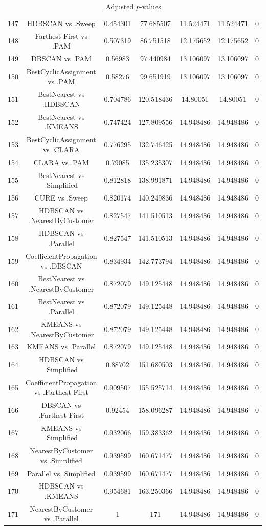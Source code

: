 \documentclass[a4paper,10pt]{article}
\begin{document}
\begin{landscape}
\begin{table}[!htp]
\begin{tabular}{ccccccc}
147&HDBSCAN vs .Sweep&0.454301&77.685507&11.524471&11.524471&0\\
148&Farthest-First vs .PAM&0.507319&86.751518&12.175652&12.175652&0\\
149&DBSCAN vs .PAM&0.56983&97.440984&13.106097&13.106097&0\\
150&BestCyclicAssignment vs .PAM&0.58276&99.651919&13.106097&13.106097&0\\
151&BestNearest vs .HDBSCAN&0.704786&120.518436&14.80051&14.80051&0\\
152&BestNearest vs .KMEANS&0.747424&127.809556&14.948486&14.948486&0\\
153&BestCyclicAssignment vs .CLARA&0.776295&132.746425&14.948486&14.948486&0\\
154&CLARA vs .PAM&0.79085&135.235307&14.948486&14.948486&0\\
155&BestNearest vs .Simplified&0.812818&138.991871&14.948486&14.948486&0\\
156&CURE vs .Sweep&0.820174&140.249836&14.948486&14.948486&0\\
157&HDBSCAN vs .NearestByCustomer&0.827547&141.510513&14.948486&14.948486&0\\
158&HDBSCAN vs .Parallel&0.827547&141.510513&14.948486&14.948486&0\\
159&CoefficientPropagation vs .DBSCAN&0.834934&142.773794&14.948486&14.948486&0\\
160&BestNearest vs .NearestByCustomer&0.872079&149.125448&14.948486&14.948486&0\\
161&BestNearest vs .Parallel&0.872079&149.125448&14.948486&14.948486&0\\
162&KMEANS vs .NearestByCustomer&0.872079&149.125448&14.948486&14.948486&0\\
163&KMEANS vs .Parallel&0.872079&149.125448&14.948486&14.948486&0\\
164&HDBSCAN vs .Simplified&0.88702&151.680503&14.948486&14.948486&0\\
165&CoefficientPropagation vs .Farthest-First&0.909507&155.525714&14.948486&14.948486&0\\
166&DBSCAN vs .Farthest-First&0.92454&158.096287&14.948486&14.948486&0\\
167&KMEANS vs .Simplified&0.932066&159.383362&14.948486&14.948486&0\\
168&NearestByCustomer vs .Simplified&0.939599&160.671477&14.948486&14.948486&0\\
169&Parallel vs .Simplified&0.939599&160.671477&14.948486&14.948486&0\\
170&HDBSCAN vs .KMEANS&0.954681&163.250366&14.948486&14.948486&0\\
171&NearestByCustomer vs .Parallel&1&171&14.948486&14.948486&0\\
\hline
\end{tabular}
\caption{Adjusted $p$-values}
\end{table}

\end{landscape}
\end{document}
